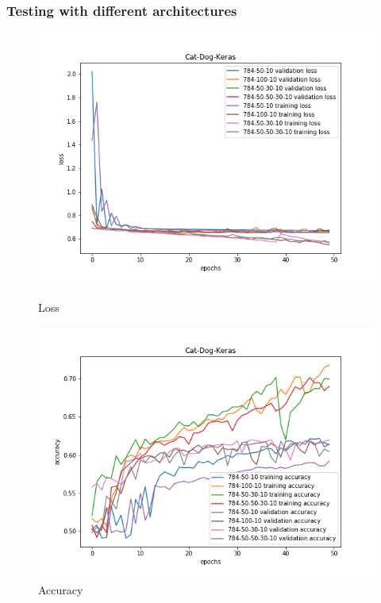 \documentclass{article}
\begin{document}
\subsubsection{Testing with different architectures}

\begin{figure}[!htb]
	\includegraphics[width=\linewidth]{../output_plots/part_2_task_4_best_loss.png}
	\caption{Loss}\label{fig:part_2_task_4_best_loss}
	\endminipage\hfill
	\includegraphics[width=\linewidth]{../output_plots/part_2_task_4_best_accuracy.png}
	\caption{Accuracy}\label{fig:part_2_task_4_best_accuracy}
	\endminipage\hfill
\end{figure}
\end{document}
